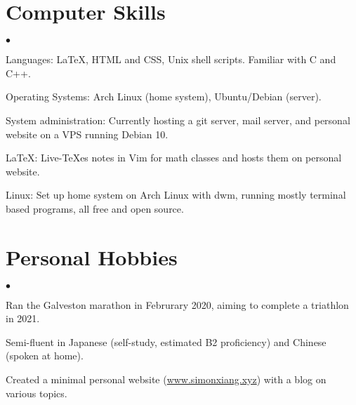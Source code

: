 \documentclass[margin,line]{res}
\newenvironment{list2}{
  \begin{list}{$\bullet$}{%
      \setlength{\itemsep}{0in}
      \setlength{\parsep}{0in} \setlength{\parskip}{0in}
      \setlength{\topsep}{0in} \setlength{\partopsep}{0in} 
      \setlength{\leftmargin}{0.2in}}}{\end{list}}
\begin{document}
\begin{resume}
\section{\sc Computer Skills} 
\begin{list2}
\item Languages:  \LaTeX{}, HTML and CSS, Unix shell scripts. Familiar with C and C++.
\item Operating Systems:  Arch Linux (home system), Ubuntu/Debian (server).
\item System administration: Currently hosting a git server, mail server, and personal website on a VPS running Debian 10.
\item \LaTeX{}: Live-\TeX{}es notes in Vim for math classes and hosts them on personal website.
\item Linux: Set up home system on Arch Linux with dwm, running mostly terminal based programs, all free and open source. 
\end{list2}

\section{\sc Personal Hobbies} 
\begin{list2}
\item Ran the Galveston marathon in Februrary 2020, aiming to complete a triathlon in 2021.
\item Semi-fluent in Japanese (self-study, estimated B2 proficiency) and  Chinese (spoken at home).
\item Created a minimal personal website (\url{www.simonxiang.xyz}) with a blog on various topics.
\end{list2}


\end{resume}
\end{document}
